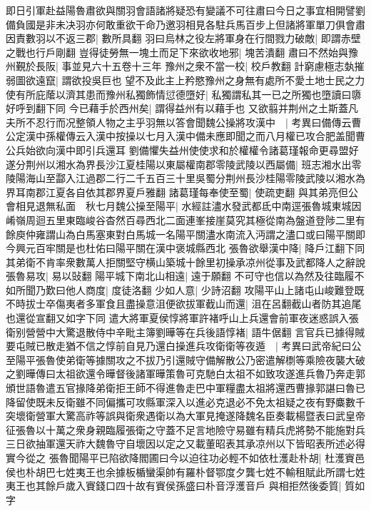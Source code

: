 即日引軍赴益陽魯肅欲與關羽會語諸將疑恐有變議不可往肅曰今日之事宜相開譬劉備負國是非未决羽亦何敢重欲干命乃邀羽相見各駐兵馬百步上但諸將軍單刀俱會肅因責數羽以不返三郡|{
	數所具翻}
羽曰烏林之役左將軍身在行間戮力破敵|{
	即謂赤壁之戰也行戶剛翻}
豈得徒勞無一塊土而足下來欲收地邪|{
	塊苦潰翻}
肅曰不然始與豫州覲於長阪|{
	事並見六十五卷十三年}
豫州之衆不當一校|{
	校戶教翻}
計窮慮極志埶摧弱圖欲遠竄|{
	謂欲投吳巨也}
望不及此主上矜愍豫州之身無有處所不愛土地士民之力使有所庇䕃以濟其患而豫州私獨飾情愆德墮好|{
	私獨謂私其一已之所獨也墮讀曰隳好呼到翻下同}
今已藉手於西州矣|{
	謂得益州有以藉手也}
又欲翦并荆州之土斯蓋凡夫所不忍行而况整領人物之主乎羽無以答會聞魏公操將攻漢中　|{
	考異曰備傳云曹公定漢中孫權傳云入漢中按操以七月入漢中備未應即聞之而八月權已攻合肥盖聞曹公兵始欲向漢中即引兵還耳}
劉備懼失益州使使求和於權權令諸葛瑾報命更尋盟好遂分荆州以湘水為界長沙江夏桂陽以東屬權南郡零陵武陵以西屬備|{
	班志湘水出零陵陽海山至酃入江過郡二行二千五百三十里吳蜀分荆州長沙桂陽零陵武陵以湘水為界耳南郡江夏各自依其郡界夏戶雅翻}
諸葛瑾每奉使至蜀|{
	使疏吏翻}
與其弟亮但公會相見退無私面　秋七月魏公操至陽平|{
	水經註濜水發武都氐中南逕張魯城東城因崤嶺周迴五里東臨峻谷杳然百尋西北二面連峯接崖莫究其極從南為盤道登陟二里有餘庾仲雍謂山為白馬塞東對白馬城一名陽平關濜水南流入沔謂之濜口或曰陽平關即今興元百牢關是也杜佑曰陽平關在漢中褒城縣西北}
張魯欲舉漢中降|{
	降戶江翻下同}
其弟衛不肯率衆數萬人拒關堅守横山築城十餘里初操承凉州從事及武都降人之辭說張魯易攻|{
	易以䜴翻}
陽平城下南北山相遠|{
	遠于願翻}
不可守也信以為然及往臨履不如所聞乃歎曰他人商度|{
	度徒洛翻}
少如人意|{
	少詩沼翻}
攻陽平山上諸屯山峻難登既不時拔士卒傷夷者多軍食且盡操意沮便欲拔軍截山而還|{
	沮在呂翻截山者防其追尾也還從宣翻又如字下同}
遣大將軍夏侯惇將軍許褚呼山上兵還會前軍夜迷惑誤入張衛别營營中大驚退散侍中辛毗主簿劉曄等在兵後語惇褚|{
	語牛倨翻}
言官兵已據得賊要屯賊已散走猶不信之惇前自見乃還白操進兵攻衛衛等夜遁　|{
	考異曰武帝紀曰公至陽平張魯使弟衛等據關攻之不拔乃引還賊守備解散公乃密遣解檦等乘險夜襲大破之劉曄傳曰太祖欲還令曄督後諸軍曄策魯可克馳白太祖不如致攻遂進兵魯乃奔走郭頒世語魯遣五官掾降弟衛拒王師不得進魯走巴中軍糧盡太祖將還西曹掾郭諶曰魯已降留使既未反衛雖不同偏攜可攻縣軍深入以進必克退必不免太祖疑之夜有野麋數千突壞衛營軍大驚高祚等誤與衛衆遇衛以為大軍見掩遂降魏名臣奏載楊暨表曰武皇帝征張魯以十萬之衆身親臨履張衛之守蓋不足言地險守易雖有精兵虎將勢不能施對兵三日欲抽軍還天祚大魏魯守自壞因以定之又載董昭表其承凉州以下皆昭表所述必得實今從之}
張魯聞陽平已陷欲降閻圃曰今以迫往功必輕不如依杜濩赴朴胡|{
	杜濩賨邑侯也朴胡巴七姓夷王也余據板楯蠻渠帥有羅朴督鄂度夕龔七姓不輸租賦此所謂七姓夷王也其餘戶歲入賨錢口四十故有賨侯孫盛曰朴音浮濩音戶}
與相拒然後委質|{
	質如字}
